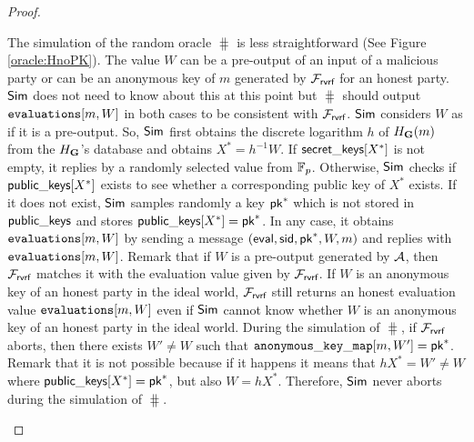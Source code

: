 \begin{proof}
\begin{itemize}
		 The simulation of the random oracle $ \hash $ is less straightforward (See Figure \ref{oracle:HnoPK}).
		The value $ W $ can be a pre-output of an input  of a malicious party or can be an anonymous key of  $ m $ generated by $ \mathcal{F}_{\textsf{rvrf}} $ for an honest party. $ \mathsf{Sim} $ does not need to know about this at this point but $ \hash $ should output $ \texttt{evaluations}[m,W] $ in both cases to be consistent with $ \mathcal{F}_{\textsf{rvrf}} $.	 
		$ \mathsf{Sim} $ considers $ W $ as if it is a pre-output. So, $ \mathsf{Sim} $ first obtains the discrete logarithm $ h $ of $ H_{\mathbf{G}}(m) $ from the $ H_{\mathbf{G}} $'s database and obtains $ X^* = h^{-1}W $.    
		If  $ {\mathsf{secret\_keys}}[X^*] $ is not empty, it replies by a randomly selected value from $ \mathbb{F}_p $.
		Otherwise,
		$ \mathsf{Sim} $ checks if $ {\mathsf{public\_keys}}[X^*] $ exists to see whether a corresponding public key of $ X^* $ exists. If it does not exist, $ \mathsf{Sim} $ samples randomly a key $ \mathsf{pk}^* $ which is not stored in $ {\mathsf{public\_keys}} $ and stores $ {\mathsf{public\_keys}}[X^*] = \mathsf{pk}^* $. In any case, it obtains $ \texttt{evaluations}[m,W] $ by sending a message $ (\mathsf{eval}, \textsf{sid},\mathsf{pk}^*,W,m) $ and replies with $ \texttt{evaluations}[m,W] $.
		Remark that if $ W $ is a pre-output generated by $ \mathcal{A} $, then $ \mathcal{F}_{\textsf{rvrf}} $ matches it with the evaluation value given by $ \mathcal{F}_{\textsf{rvrf}} $. If $ W $ is an anonymous key of an honest party in the ideal world, $ \mathcal{F}_{\textsf{rvrf}} $ still returns an honest evaluation value $ \texttt{evaluations}[m,W] $ even if $ \mathsf{Sim} $ cannot know whether $ W $ is an anonymous key of an honest party in the ideal world. 
		During the simulation of $ \hash $, if $ \mathcal{F}_{\textsf{rvrf}} $ aborts, then there exists $ W' \neq W $ such that $ \mathtt{anonymous\_key\_map}[m,W'] = \mathsf{pk}^* $. Remark that it is not possible because if it happens it means that $ hX^* = W' \neq W  $ where $ {\mathsf{public\_keys}}[X^*] = \mathsf{pk}^* $, but also $ W = hX^* $. 
		Therefore, $ \mathsf{Sim} $ never aborts during the simulation of $ \hash $.
		

\end{itemize}
\end{proof}
